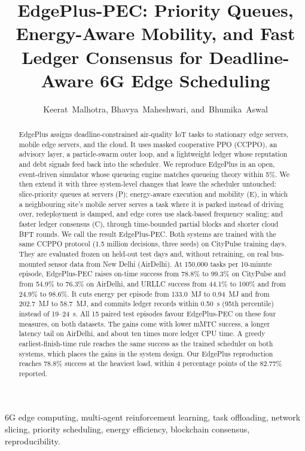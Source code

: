 \documentclass[11pt,journal,onecolumn]{IEEEtran}
\begin{document}
\title{EdgePlus-PEC: Priority Queues, Energy-Aware Mobility, and Fast Ledger Consensus for Deadline-Aware 6G Edge Scheduling}
\author{Keerat~Malhotra, Bhavya~Maheshwari, and~Bhumika~Aswal}
\maketitle

\begin{abstract}
EdgePlus assigns deadline-constrained air-quality IoT tasks to stationary edge servers, mobile edge servers, and the cloud. It uses masked cooperative PPO (CCPPO), an advisory layer, a particle-swarm outer loop, and a lightweight ledger whose reputation and debt signals feed back into the scheduler. We reproduce EdgePlus in an open, event-driven simulator whose queueing engine matches queueing theory within 5\%. We then extend it with three system-level changes that leave the scheduler untouched: slice-priority queues at servers (P); energy-aware execution and mobility (E), in which a neighbouring site's mobile server serves a task where it is parked instead of driving over, redeployment is damped, and edge cores use slack-based frequency scaling; and faster ledger consensus (C), through time-bounded partial blocks and shorter cloud BFT rounds. We call the result EdgePlus-PEC. Both systems are trained with the same CCPPO protocol (1.5 million decisions, three seeds) on CityPulse training days. They are evaluated frozen on held-out test days and, without retraining, on real bus-mounted sensor data from New Delhi (AirDelhi). At 150,000 tasks per 10-minute episode, EdgePlus-PEC raises on-time success from 78.8\% to 99.3\% on CityPulse and from 54.9\% to 76.3\% on AirDelhi, and URLLC success from 44.1\% to 100\% and from 24.9\% to 98.6\%. It cuts energy per episode from 133.0~MJ to 0.94~MJ and from 202.7~MJ to 58.7~MJ, and commits ledger records within 0.50~s (95th percentile) instead of 19--24~s. All 15 paired test episodes favour EdgePlus-PEC on these four measures, on both datasets. The gains come with lower mMTC success, a longer latency tail on AirDelhi, and about ten times more ledger CPU time. A greedy earliest-finish-time rule reaches the same success as the trained scheduler on both systems, which places the gains in the system design. Our EdgePlus reproduction reaches 78.8\% success at the heaviest load, within 4 percentage points of the 82.77\% reported.
\end{abstract}

\begin{IEEEkeywords}
6G edge computing, multi-agent reinforcement learning, task offloading, network slicing, priority scheduling, energy efficiency, blockchain consensus, reproducibility.
\end{IEEEkeywords}
\end{document}
